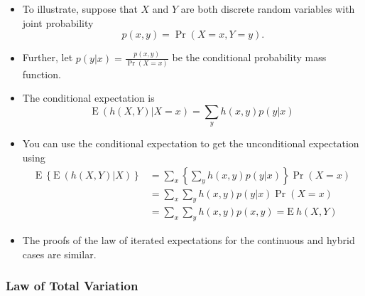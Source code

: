 \documentclass[]{book}
\theoremstyle{definition}
\theoremstyle{definition}
\theoremstyle{definition}
\theoremstyle{remark}
\begin{document}
\begin{itemize}
\item
  To illustrate, suppose that \(X\) and \(Y\) are both discrete random
  variables with joint probability \[p(x,y) = \Pr(X=x, Y=y).\]
\item
  Further, let \(p(y|x) = \frac{p(x,y)}{\Pr(X=x)}\) be the conditional
  probability mass function.
\item
  The conditional expectation is
  \[\mathrm{E~} \left( h(X,Y) | X=x \right) = \sum_y h(x,y) p(y|x)\]
\item
  You can use the conditional expectation to get the unconditional
  expectation using \[\begin{aligned}
   \mathrm{E~} \left\{ \mathrm{E~} \left( h(X,Y) | X \right) \right \}
  &= \sum_x  \left\{\sum_y h(x,y) p(y|x) \right \} \Pr(X=x) \\
  &= \sum_x  \sum_y h(x,y) p(y|x)  \Pr(X=x) \\
  &=  \sum_x  \sum_y h(x,y) p(x,y)
  =  \mathrm{E~} h(X,Y)\end{aligned}\]
\item
  The proofs of the law of iterated expectations for the continuous and
  hybrid cases are similar.
\end{itemize}

\subsubsection{Law of Total Variation}\label{law-of-total-variation}
\end{document}
